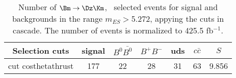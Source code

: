 \begin{table}[htb!]
 \begin{center}
 {\small
 \begin{tabular}{|c|c|c|c|c|c|c|} \hline
 Selection cuts  & signal  & $B^0\bar{B^0}$ & $B^+B^-$ & uds & $c\bar{c}$ & $S$  \\ \hline\hline 
cut costhetathrust  &  177  &  22  &  28  &  31  &  63  &  9.856 \\ 
\hline
 \end{tabular}
 }
 \caption{\small Number of $\Bm  \to \Dz \Km$, \kspipi\ selected events for signal and backgrounds in the range $m_{ES}$$>$5.272, appying the cuts in cascade. The number of events is normalized to 425.5 fb$^{-1}$.}
 \label{tab:selectiondk_kspipi}
 \end{center}
 \end{table}

